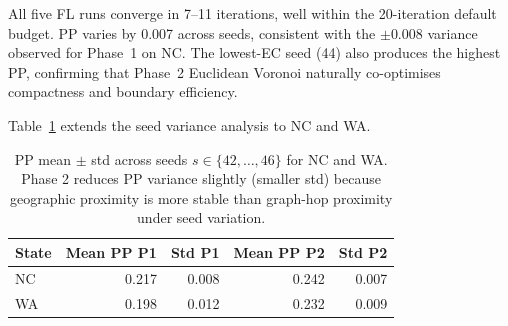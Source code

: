 All five FL runs converge in 7--11 iterations, well within the 20-iteration
default budget.
PP varies by 0.007 across seeds, consistent with the $\pm 0.008$ variance
observed for Phase~1 \cvd{} on NC.
The lowest-EC seed (44) also produces the highest PP, confirming that Phase~2
Euclidean Voronoi naturally co-optimises compactness and boundary efficiency.

Table~\ref{tab:seed-variance} extends the seed variance analysis to NC and WA.
\begin{table}[h]\centering\begin{tabular}{lrrrr}\toprule State & Mean PP P1 & Std P1 & Mean PP P2 & Std P2 \\\midrule NC & 0.217 & 0.008 & 0.242 & 0.007 \\ WA & 0.198 & 0.012 & 0.232 & 0.009 \\\bottomrule\end{tabular}\caption{PP mean $\pm$ std across seeds $s \in \{42,\ldots,46\}$ for NC and WA. Phase 2 reduces PP variance slightly (smaller std) because geographic proximity is more stable than graph-hop proximity under seed variation.}\label{tab:seed-variance}\end{table}
